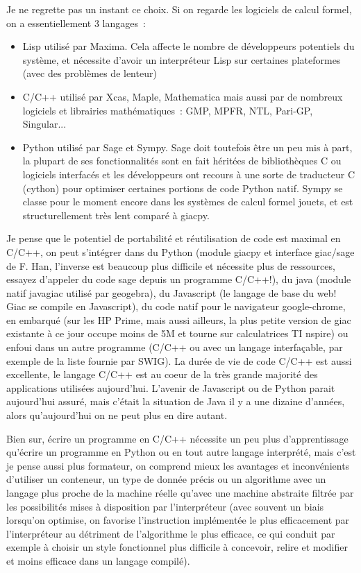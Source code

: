 \documentclass[a4paper,11pt]{article}
\begin{document}
\begin{giacjshere}
Je ne regrette pas un instant ce choix. Si on regarde les logiciels
de calcul formel, on a essentiellement 3 langages~:
\begin{itemize}
\item Lisp utilis\'e par Maxima. Cela affecte
le nombre de d\'eveloppeurs potentiels du syst\`eme,
et n\'ecessite d'avoir un interpr\'eteur Lisp sur
certaines plateformes (avec des probl\`emes de lenteur)
\item C/C++ utilis\'e par Xcas, Maple, Mathematica
mais aussi par de nombreux logiciels et librairies
math\'ematiques~: GMP, MPFR, NTL,
Pari-GP, Singular...
\item Python utilis\'e par Sage et Sympy. Sage doit toutefois
\^etre un peu mis \`a part, la plupart de ses fonctionnalit\'es
sont en fait h\'erit\'ees de biblioth\`eques C ou logiciels
interfac\'es et les d\'eveloppeurs ont recours \`a une
sorte de traducteur C (cython) pour optimiser certaines portions de code
Python natif. Sympy se classe pour le moment encore dans les
syst\`emes de calcul formel jouets,
et est structurellement tr\`es lent compar\'e \`a giacpy.
\end{itemize}
Je pense que le potentiel de portabilit\'e
et r\'eutilisation de code est maximal en C/C++,
on peut s'int\'egrer dans du Python (module giacpy
et interface giac/sage de F. Han, l'inverse est beaucoup plus difficile et
n\'ecessite plus de ressources, essayez d'appeler
du code sage depuis un programme C/C++!),
du java (module natif javagiac utilis\'e par geogebra),
du Javascript (le langage de base du web! Giac se compile en
Javascript),
du code natif pour le navigateur google-chrome,
en embarqu\'e (sur les HP Prime, mais aussi ailleurs,
la plus petite version de giac existante \`a ce jour
occupe moins de 5M et tourne sur calculatrices TI nspire) ou
enfoui dans un autre programme (C/C++ ou avec
un langage interfa\c{c}able, par exemple de la liste fournie par SWIG).
La dur\'ee de vie de code C/C++ est aussi excellente, le
langage C/C++ est au coeur de la tr\`es grande majorit\'e
des applications utilis\'ees aujourd'hui. L'avenir de Javascript
ou de Python parait aujourd'hui assur\'e, mais c'\'etait
la situation de Java il y a une dizaine d'ann\'ees, alors
qu'aujourd'hui on ne peut plus en dire autant.

Bien sur, \'ecrire un programme en C/C++ n\'ecessite
un peu plus d'apprentissage qu'\'ecrire un programme
en Python ou en tout autre langage interpr\'et\'e,
mais c'est je pense aussi plus formateur, on
comprend mieux les avantages et inconv\'enients
d'utiliser un conteneur, un type de donn\'ee pr\'ecis
ou un algorithme avec un langage plus proche de la machine
r\'eelle qu'avec une machine abstraite filtr\'ee par les
possibilit\'es mises \`a disposition par l'interpr\'eteur
(avec souvent un biais lorsqu'on optimise, on favorise
l'instruction impl\'ement\'ee le plus efficacement par
l'interpr\'eteur au d\'etriment de l'algorithme le plus
efficace, ce qui conduit par exemple \`a choisir un style fonctionnel
plus difficile \`a concevoir, relire et modifier et moins
efficace dans un langage compil\'e).



\end{giacjshere}
\end{document}
